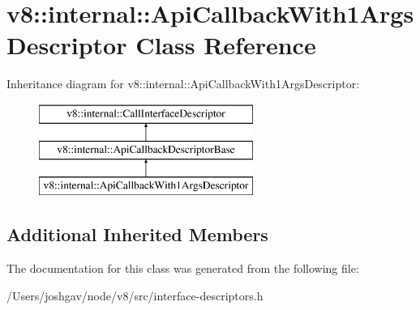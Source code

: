 \hypertarget{classv8_1_1internal_1_1_api_callback_with1_args_descriptor}{}\section{v8\+:\+:internal\+:\+:Api\+Callback\+With1\+Args\+Descriptor Class Reference}
\label{classv8_1_1internal_1_1_api_callback_with1_args_descriptor}
Inheritance diagram for v8\+:\+:internal\+:\+:Api\+Callback\+With1\+Args\+Descriptor\+:\begin{figure}[H]
\begin{center}
\leavevmode
\includegraphics[height=3.000000cm]{classv8_1_1internal_1_1_api_callback_with1_args_descriptor}
\end{center}
\end{figure}
\subsection*{Additional Inherited Members}


The documentation for this class was generated from the following file\+:\begin{DoxyCompactItemize}
\item 
/\+Users/joshgav/node/v8/src/interface-\/descriptors.\+h\end{DoxyCompactItemize}
